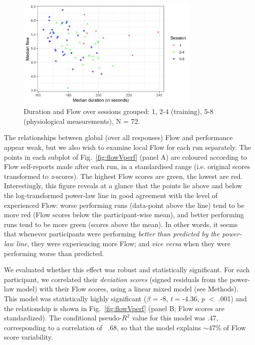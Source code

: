 \documentclass[fleqn,10pt]{wlscirep}
\newcommand{\nicewidth}{0.8\textwidth}
\begin{document}
\begin{figure}[!b]
  \centering
  \includegraphics[width=\nicewidth]{session_flowDuration_v3}
  \caption{Duration and Flow over sessions grouped: 1, 2-4 (training), 5-8 (physiological measurements), N = 72.}
  \label{fig:FlowVdurXssn}
\end{figure}

The relationships between global (over all responses) Flow and performance appear weak, but we also wish to examine local Flow for each run separately. The points in each subplot of Fig.~\ref{fig:flowVperf} (panel A) are coloured according to Flow self-reports made after each run, in a standardised range (i.e. original scores transformed to {\it z}-scores). The highest Flow scores are green, the lowest are red. Interestingly, this figure reveals at a glance that the points lie above and below the log-transformed power-law line in good agreement with the level of experienced Flow: worse performing runs (data-point above the line) tend to be more red (Flow scores below the participant-wise mean), and better performing runs tend to be more green (scores above the mean). In other words, it seems that whenever participants were performing {\it better than predicted by the power-law line}, they were experiencing more Flow; and {\it vice versa} when they were performing worse than predicted.

We evaluated whether this effect was robust and statistically significant. For each participant, we correlated their {\it deviation scores} (signed residuals from the power-law model) with their Flow scores, using a linear mixed model (see Methods). This model was statistically highly significant ($\beta$ = -8, {\it t} = -4.36, {\it p} $<$ .001) and the relationship is shown in Fig.~\ref{fig:flowVperf} (panel B; Flow scores are standardized). The conditional pseudo-$R^2$ value for this model was .47, corresponding to a correlation of ~.68, so that the model explains $\sim$47\% of Flow score variability.
\end{document}
